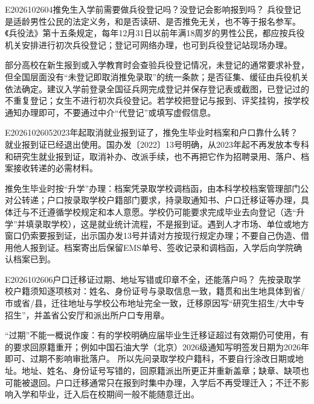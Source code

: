 \begin{qa}{E2026102604}{推免生入学前需要做兵役登记吗？没登记会影响报到吗？}
兵役登记是适龄男性公民的法定义务，和是否读研、是否推免无关，也不等于报名参军。《兵役法》第十五条规定，每年12月31日以前年满18周岁的男性公民，都应按兵役机关安排进行初次兵役登记；登记可网络办理，也可到兵役登记站现场办理。

部分高校在新生报到或入学教育时会查验兵役登记情况，未登记的通常要求补登，但全国层面没有“未登记即取消推免录取”的统一条款；是否征集、缓征由兵役机关依法确定。建议入学前登录全国征兵网完成登记并保存登记表或截图，已登记过的不重复登记；女生不进行初次兵役登记。若学校把登记与报到、评奖挂钩，按学校通知办理即可，不要通过中介“代登记”或填写虚假信息。
\end{qa}

\begin{qa}{E2026102605}{2023年起取消就业报到证了，推免生毕业时档案和户口靠什么转？}
就业报到证已经退出使用。国办发〔2022〕13号明确，从2023年起不再发放本专科和研究生就业报到证，取消补办、改派手续，也不再把它作为招聘录用、落户、档案接收转递的必需材料。

推免生毕业时按“升学”办理：档案凭录取学校调档函，由本科学校档案管理部门公对公转递；户口按录取学校户籍部门要求，持录取通知书、户口迁移证等办理，具体迁与不迁遵循学校规定和本人意愿。学校仍可能要求完成毕业去向登记（选“升学”并填录取学校），这是就业统计流程，不是报到证。遇到人才市场、单位或地方窗口仍索要报到证，出示国办发13号并请对方按现行规定办理；不要自己伪造、借用他人报到证。档案寄出后保留EMS单号、签收记录和调档函，入学后向学院确认档案已到。
 
\end{qa}

\begin{qa}{E2026102606}{户口迁移证过期、地址写错或印章不全，还能落户吗？}
先按录取学校户籍须知逐项核对：姓名、身份证号与录取信息一致，籍贯和出生地具体到省/市或省/县，迁往地址与学校公布地址完全一致，迁移原因写“研究生招生/大中专招生”，并盖省公安厅和派出所户口专用章。

“过期”不能一概说作废：有的学校明确应届毕业生迁移证超过有效期仍可使用，有的要求回原籍重开；例如中国石油大学（北京）2026级通知写明签发日期为2026年即可、过期不影响审批落户。 所以先问录取学校户籍科，不要自行涂改日期或地址。地址、姓名、身份证号写错的，回原籍派出所更正并重新盖章；缺章、缺项也可能被退回。户口迁移通常只在报到时集中办理，入学后不再受理迁入；不迁不影响入学和毕业，迁入后在校期间一般不能随意迁出。
 
\end{qa}

